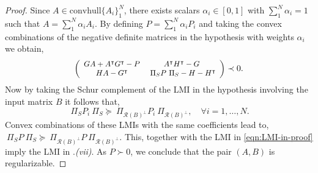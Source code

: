 \documentclass[journal]{IEEEtran}
\theoremstyle{definition}
\theoremstyle{remark}
\newcommand\scalemath[2]{\scalebox{#1}{\mbox{\ensuremath{\displaystyle #2}}}}
\begin{document}
    \begin{proof} 
    Since $A \in \mathrm{convhull}\{A_i\}_1^N$, there exists scalars $ \alpha_i \in [0,1]$ with $\sum_1^N \alpha_i = 1$ such that $A = \sum_1^N \alpha_i A_i$.
    By defining  $P = \sum_1^N \alpha_i P_i$ and taking the convex combinations  of the negative definite matrices in the hypothesis with weights $\alpha_i$ we obtain,
    \begin{gather}
    \scalemath{0.9}{
    \left(\begin{array}{cc}
	     G A + A^\intercal G^\intercal - P &  A^\intercal H^\intercal - G \\
	     H A - G^\intercal & ~\Pi_{S} P ~\Pi_{S} - H -H^\intercal
    	\end{array}{}\right)} \prec 0.     
	    \label{eqn:LMI-in-proof}
    \end{gather}
	Now by taking the Schur complement of the \ac{LMI} in the hypothesis involving the input matrix $B$ it follows that,
	\[~\Pi_{S} P_i ~\Pi_{S} \succeq ~\Pi_{\mathcal{R}(B)^\perp} P_i ~\Pi_{\mathcal{R}(B)^\perp}, \quad \forall i=1,\dots, N.\]
Convex combinations of these \ac{LMI}s with the same coefficients lead to,
	\(~\Pi_{S} P ~\Pi_{S} \succeq ~\Pi_{\mathcal{R}(B)^\perp} P ~\Pi_{\mathcal{R}(B)^\perp}.\)
	This, together with the \ac{LMI} in \cref{eqn:LMI-in-proof} imply the \ac{LMI} in .\textit{(vii)}. 
	As $P \succ 0$, we conclude that the pair $(A,B)$ is regularizable.
    \end{proof}
\end{document}
